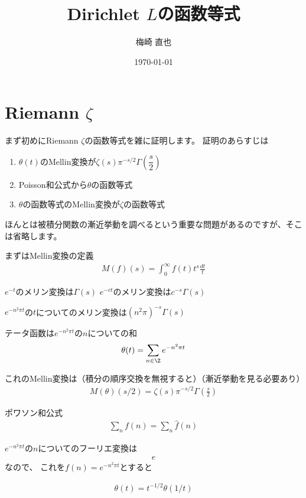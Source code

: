 \documentclass[uplatex, a4paper]{jsbook}
\title{Dirichlet $L$の函数等式}
\author{梅崎 直也}
\date{\today}                                           %
\begin{document}
\maketitle

\section{Riemann $\zeta$}
まず初めにRiemann $\zeta$の函数等式を雑に証明します。
証明のあらすじは
\begin{enumerate}
\item $\theta(t)$のMellin変換が$\zeta(s)\pi^{-s/2}\Gamma(\dfrac{s}{2})$
\item Poisson和公式から$\theta$の函数等式
\item $\theta$の函数等式のMellin変換が$\zeta$の函数等式
\end{enumerate}
ほんとは被積分関数の漸近挙動を調べるという重要な問題があるのですが、そこは省略します。

まずはMellin変換の定義
\begin{align*}
M(f)(s)=\int^\infty_0f(t)t^{s}\frac{dt}{t}
\end{align*}

\begin{eg}
$e^{-t}$のメリン変換は$\Gamma(s)$
$e^{-ct}$のメリン変換は$c^{-s}\Gamma(s)$

$e^{-n^2\pi t}$の$t$についてのメリン変換は$(n^2\pi)^{-s}\Gamma(s)$
\end{eg}

\begin{dfn}
テータ函数は$e^{-n^2\pi t}$の$n$についての和
\begin{align*}
\theta(t)=\sum_{n\in \Z}e^{-n^2\pi t}
\end{align*}
\end{dfn}

これのMellin変換は（積分の順序交換を無視すると）（漸近挙動を見る必要あり）
\begin{align*}
M(\theta)(s/2)=\zeta(s)\pi^{-s/2}\Gamma(\frac{s}{2})
\end{align*}

ポワソン和公式
\begin{align*}
\sum_nf(n)=\sum_n\hat{f}(n)
\end{align*}

$e^{-n^2\pi t}$の$n$についてのフーリエ変換は
\begin{align*}
e
\end{align*}
なので、
これを$f(n)=e^{-n^2\pi t}$とすると

\begin{align*}
\theta(t)=t^{-1/2}\theta(1/t)
\end{align*}
\end{document}
